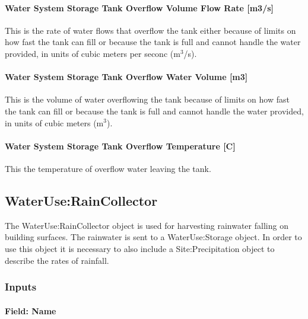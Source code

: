 \paragraph{Water System Storage Tank Overflow Volume Flow Rate {[}m3/s{]}}\label{water-system-storage-tank-overflow-volume-flow-rate-m3s}

This is the rate of water flows that overflow the tank either because of limits on how fast the tank can fill or because the tank is full and cannot handle the water provided, in units of cubic meters per seconc (m\(^{3}\)/s).

\paragraph{Water System Storage Tank Overflow Water Volume {[}m3{]}}\label{water-system-storage-tank-overflow-water-volume-m3}

This is the volume of water overflowing the tank because of limits on how fast the tank can fill or because the tank is full and cannot handle the water provided, in units of cubic meters (m\(^{3}\)).

\paragraph{Water System Storage Tank Overflow Temperature {[}C{]}}\label{water-system-storage-tank-overflow-temperature-c}

This the temperature of overflow water leaving the tank.

\subsection{WaterUse:RainCollector}\label{wateruseraincollector}

The WaterUse:RainCollector object is used for harvesting rainwater falling on building surfaces. The rainwater is sent to a WaterUse:Storage object. In order to use this object it is necessary to also include a Site:Precipitation object to describe the rates of rainfall.

\subsubsection{Inputs}\label{inputs-3-041}

\paragraph{Field: Name}\label{field-name-3-037}

